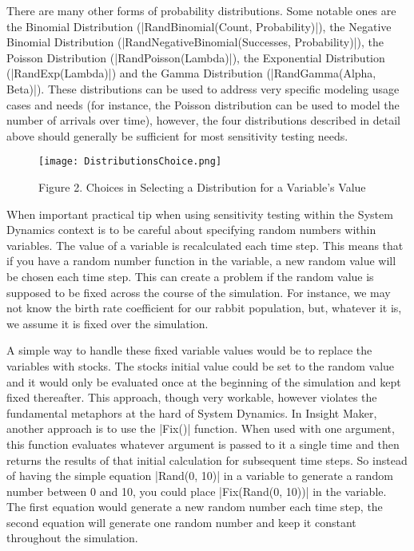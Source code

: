 \documentclass[]{memoir}
\makeatletter
\newcommand{\DecValTok}[1]{\textcolor[rgb]{0.25,0.63,0.44}{{#1}}}
\newcommand{\FunctionTok}[1]{\textcolor[rgb]{0.02,0.16,0.49}{{#1}}}
\newcommand{\NormalTok}[1]{{#1}}
\def\maxwidth{\ifdim\Gin@nat@width>\linewidth\linewidth
\else\Gin@nat@width\fi}
\let\Oldincludegraphics\includegraphics
\renewcommand{\includegraphics}[1]{\Oldincludegraphics[width=\maxwidth]{#1}}
\makeatother
\begin{document}
There are many other forms of probability distributions. Some notable
ones are the Binomial Distribution
(|\FunctionTok{RandBinomial}\NormalTok{(Count, Probability)}|), the
Negative Binomial Distribution
(|\FunctionTok{RandNegativeBinomial}\NormalTok{(Successes, Probability)}|),
the Poisson Distribution
(|\FunctionTok{RandPoisson}\NormalTok{(Lambda)}|), the Exponential
Distribution (|\FunctionTok{RandExp}\NormalTok{(Lambda)}|) and the Gamma
Distribution (|\FunctionTok{RandGamma}\NormalTok{(Alpha, Beta)}|). These
distributions can be used to address very specific modeling usage cases
and needs (for instance, the Poisson distribution can be used to model
the number of arrivals over time), however, the four distributions
described in detail above should generally be sufficient for most
sensitivity testing needs.

\begin{figure}[htbp]
\centering
\texttt{[image: DistributionsChoice.png]}
\caption{Figure 2. Choices in Selecting a Distribution for a Variable's
Value}
\end{figure}

When important practical tip when using sensitivity testing within the
System Dynamics context is to be careful about specifying random numbers
within variables. The value of a variable is recalculated each time
step. This means that if you have a random number function in the
variable, a new random value will be chosen each time step. This can
create a problem if the random value is supposed to be fixed across the
course of the simulation. For instance, we may not know the birth rate
coefficient for our rabbit population, but, whatever it is, we assume it
is fixed over the simulation.

A simple way to handle these fixed variable values would be to replace
the variables with stocks. The stocks initial value could be set to the
random value and it would only be evaluated once at the beginning of the
simulation and kept fixed thereafter. This approach, though very
workable, however violates the fundamental metaphors at the hard of
System Dynamics. In Insight Maker, another approach is to use the
|\FunctionTok{Fix}\NormalTok{()}| function. When used with one argument,
this function evaluates whatever argument is passed to it a single time
and then returns the results of that initial calculation for subsequent
time steps. So instead of having the simple equation
|\FunctionTok{Rand}\NormalTok{(}\DecValTok{0}\NormalTok{, }\DecValTok{10}\NormalTok{)}|
in a variable to generate a random number between 0 and 10, you could
place
|\FunctionTok{Fix}\NormalTok{(}\FunctionTok{Rand}\NormalTok{(}\DecValTok{0}\NormalTok{, }\DecValTok{10}\NormalTok{))}|
in the variable. The first equation would generate a new random number
each time step, the second equation will generate one random number and
keep it constant throughout the simulation.
\end{document}
